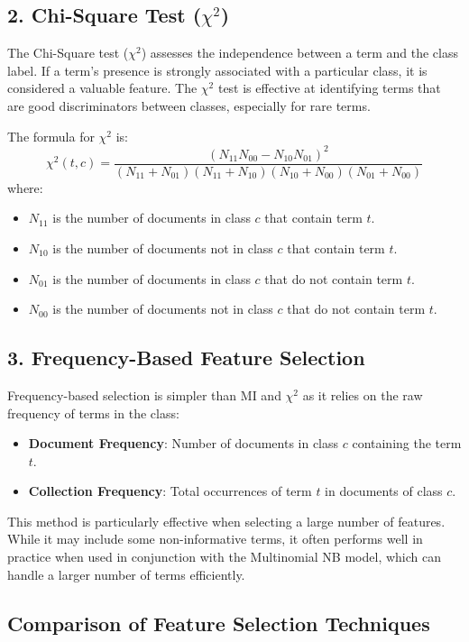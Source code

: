 \documentclass{article}
\begin{document}
\subsection*{2. Chi-Square Test ($\chi^2$)}

The Chi-Square test ($\chi^2$) assesses the independence between a term and the class label. If a term’s presence is strongly associated with a particular class, it is considered a valuable feature. The $\chi^2$ test is effective at identifying terms that are good discriminators between classes, especially for rare terms.

The formula for $\chi^2$ is:
\[
\chi^2(t, c) = \frac{(N_{11} N_{00} - N_{10} N_{01})^2}{(N_{11} + N_{01})(N_{11} + N_{10})(N_{10} + N_{00})(N_{01} + N_{00})}
\]
where:
\begin{itemize}
    \item $N_{11}$ is the number of documents in class $c$ that contain term $t$.
    \item $N_{10}$ is the number of documents not in class $c$ that contain term $t$.
    \item $N_{01}$ is the number of documents in class $c$ that do not contain term $t$.
    \item $N_{00}$ is the number of documents not in class $c$ that do not contain term $t$.
\end{itemize}

\subsection*{3. Frequency-Based Feature Selection}

Frequency-based selection is simpler than MI and $\chi^2$ as it relies on the raw frequency of terms in the class:
\begin{itemize}
    \item \textbf{Document Frequency}: Number of documents in class $c$ containing the term $t$.
    \item \textbf{Collection Frequency}: Total occurrences of term $t$ in documents of class $c$.
\end{itemize}

This method is particularly effective when selecting a large number of features. While it may include some non-informative terms, it often performs well in practice when used in conjunction with the Multinomial NB model, which can handle a larger number of terms efficiently.

\subsection*{Comparison of Feature Selection Techniques}
\end{document}
